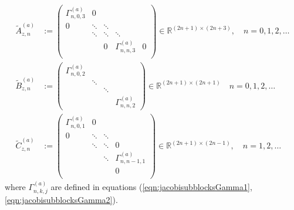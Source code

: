 \documentclass[11pt, oneside]{article}   	%
\newcommand{\R}{\mathbb{R}}
\begin{document}
\begin{align*}
	\tilde A^{(a)}_{z,n} &:= 
		\begin{pmatrix}
			\Gamma^{(a)}_{n,0,3} & 0 & \\
			0 & \ddots & \ddots & & \\
			& \ddots & \ddots & \ddots & \\
			& & 0 & \Gamma^{(a)}_{n,n,3} & 0 \\
		\end{pmatrix} \in \R^{(2n+1)\times(2n+3)}, \quad n = 0,1,2,\dots \\
	\tilde B^{(a)}_{z,n} &:= 
		\begin{pmatrix}
			\Gamma^{(a)}_{n,0,2} & \\
			& \ddots & & \\
			& & \ddots & \\
			& & & \Gamma^{(a)}_{n,n,2}
		\end{pmatrix} \in \R^{(2n+1)\times(2n+1)}  \quad n = 0,1,2,\dots \\
	\tilde C^{(a)}_{z,n} &:= 
		\begin{pmatrix}
			\Gamma^{(a)}_{n,0,1} & 0 & & \\
			0 & \ddots & \ddots & \\
			& \ddots & \ddots & 0 \\
			& & \ddots & \Gamma^{(a)}_{n,n-1,1} \\
			& & & 0 \\
		\end{pmatrix} \in \R^{(2n+1)\times(2n-1)}, \quad n = 1,2,\dots
\end{align*}
where $\Gamma^{(a)}_{n,k,j}$ are defined in equations (\ref{eqn:jacobisubblocksGamma1}, \ref{eqn:jacobisubblocksGamma2}). 
\end{document}
